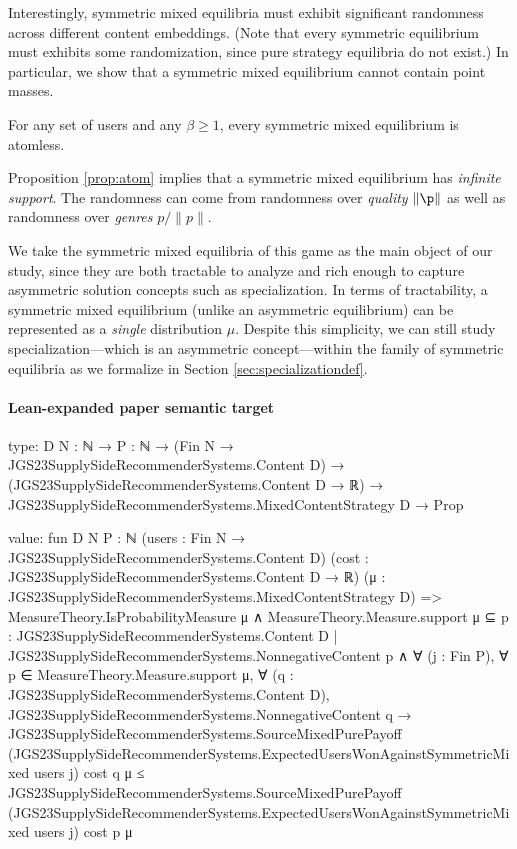 \documentclass[10pt]{article}
\begin{document}
\begin{ReviewVerbatim}
Interestingly, symmetric mixed equilibria must exhibit significant randomness across different content embeddings. (Note that every symmetric equilibrium must exhibits some randomization, since pure strategy equilibria do not exist.) In particular, we show that a symmetric mixed equilibrium cannot contain point masses.
\begin{proposition}
\label{prop:atom}
For any set of users and any $\beta \ge 1$, every symmetric mixed equilibrium is atomless.
\end{proposition}
\noindent Proposition \ref{prop:atom} implies that a symmetric mixed equilibrium has \textit{infinite support}. The randomness can come from randomness over \textit{quality} $\|\p\|$ as well as randomness over \textit{genres} $p/\|p\|$.


We take the symmetric mixed equilibria of this game as the main object of our study, since they are both tractable to analyze and rich enough to capture asymmetric solution concepts such as specialization. In terms of tractability, a symmetric mixed equilibrium (unlike an asymmetric equilibrium) can be represented as a \textit{single} distribution $\mu$. Despite this simplicity, we can still study specialization---which is an asymmetric concept---within the family of symmetric equilibria as we formalize in Section \ref{sec:specializationdef}.
\end{ReviewVerbatim}



\paragraph{Lean-expanded paper semantic target}
\begin{ReviewVerbatim}
type:
{D N : ℕ} →
  {P : ℕ} →
    (Fin N → JGS23SupplySideRecommenderSystems.Content D) →
      (JGS23SupplySideRecommenderSystems.Content D → ℝ) →
        JGS23SupplySideRecommenderSystems.MixedContentStrategy D → Prop

value:
fun {D N P : ℕ} (users : Fin N → JGS23SupplySideRecommenderSystems.Content D)
    (cost : JGS23SupplySideRecommenderSystems.Content D → ℝ)
    (μ : JGS23SupplySideRecommenderSystems.MixedContentStrategy D) =>
  MeasureTheory.IsProbabilityMeasure μ ∧
    MeasureTheory.Measure.support μ ⊆
        {p : JGS23SupplySideRecommenderSystems.Content D | JGS23SupplySideRecommenderSystems.NonnegativeContent p} ∧
      ∀ (j : Fin P),
        ∀ p ∈ MeasureTheory.Measure.support μ,
          ∀ (q : JGS23SupplySideRecommenderSystems.Content D),
            JGS23SupplySideRecommenderSystems.NonnegativeContent q →
              JGS23SupplySideRecommenderSystems.SourceMixedPurePayoff
                  (JGS23SupplySideRecommenderSystems.ExpectedUsersWonAgainstSymmetricMixed users j) cost q μ ≤
                JGS23SupplySideRecommenderSystems.SourceMixedPurePayoff
                  (JGS23SupplySideRecommenderSystems.ExpectedUsersWonAgainstSymmetricMixed users j) cost p μ
\end{ReviewVerbatim}
\end{document}
